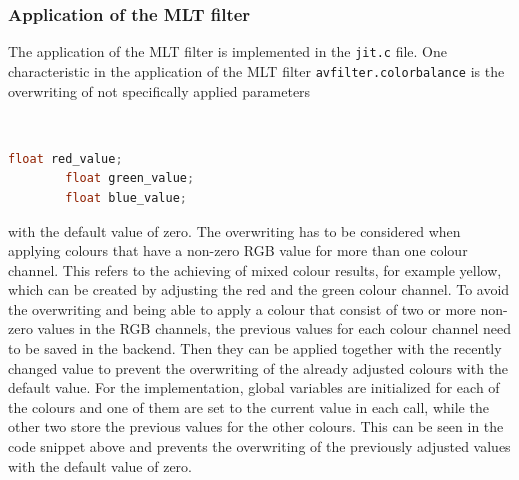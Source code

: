 \documentclass[../MasterThesis.tex]{subfiles}
\begin{document}
\subsubsection*{Application of the MLT filter}


\begin{minipage}{0.60\textwidth}
	The application of the MLT filter is implemented in the \texttt{jit.c} file. One characteristic in the application of the MLT filter \texttt{avfilter.colorbalance} is the overwriting of not specifically applied parameters
\end{minipage}\begin{minipage}{0.04\textwidth}
	\ 
\end{minipage}\begin{minipage}{0.36\textwidth}
	{\tiny\begin{lstlisting}[language=c, numbers=none]
		float red_value;
		float green_value;
		float blue_value; \end{lstlisting}}
	\vfill
\end{minipage}
\vspace*{0.0em}

with the default value of zero. The overwriting has to be considered when applying colours that have a non-zero RGB value for more than one colour channel. This refers to the achieving of mixed colour results, for example yellow, which can be created by adjusting the red and the green colour channel.
%
To avoid the overwriting and being able to apply a colour that consist of two or more non-zero values in the RGB channels, the previous values for each colour channel need to be saved in the backend. Then they can be applied together with the recently changed value to prevent the overwriting of the already adjusted colours with the default value. 
For the implementation, global variables are initialized for each of the colours and one of them are set to the current value in each call, while the other two store the previous values for the other colours. This can be seen in the code snippet above and prevents the overwriting of the previously adjusted values with the default value of zero.
\end{document}
